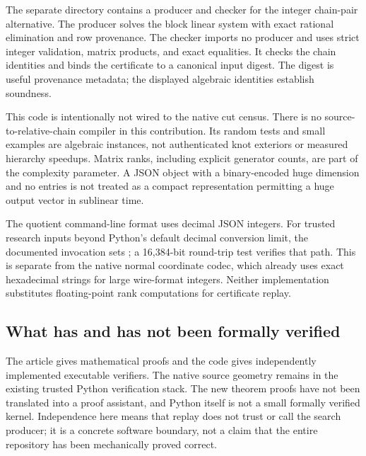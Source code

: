 The separate  directory contains a producer and
checker for the integer chain-pair alternative. The producer solves the
block linear system with exact rational elimination and row provenance.
The checker imports no producer and uses strict integer validation, matrix
products, and exact equalities. It checks the chain identities and binds
the certificate to a canonical input digest. The digest is useful provenance
metadata; the displayed algebraic identities establish soundness.

This code is intentionally not wired to the native cut census. There is no
source-to-relative-chain compiler in this contribution. Its random tests
and small examples are algebraic instances, not authenticated knot
exteriors or measured hierarchy speedups. Matrix ranks, including explicit
generator counts, are part of the complexity parameter. A JSON object with
a binary-encoded huge dimension and no entries is not treated as a compact
representation permitting a huge output vector in sublinear time.

The quotient command-line format uses decimal JSON integers. For trusted
research inputs beyond Python's default decimal conversion limit, the
documented invocation sets ; a 16,384-bit
round-trip test verifies that path. This is separate from the native normal
coordinate codec, which already uses exact hexadecimal strings for large
wire-format integers. Neither implementation substitutes floating-point
rank computations for certificate replay.

\subsection{What has and has not been formally verified}

The article gives mathematical proofs and the code gives independently
implemented executable verifiers. The native source geometry remains in
the existing trusted Python verification stack. The new theorem proofs
have not been translated into a proof assistant, and Python itself is not
a small formally verified kernel. Independence here means that replay does
not trust or call the search producer; it is a concrete software boundary,
not a claim that the entire repository has been mechanically proved correct.
